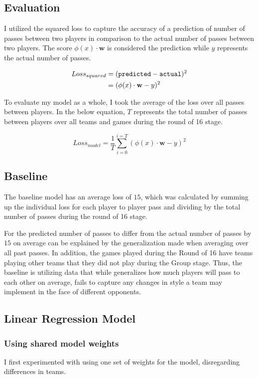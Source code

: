 \documentclass[11pt,letterpaper]{article}
\begin{document}
\subsection{Evaluation}

I utilized the squared loss to capture the accuracy of a prediction of number of passes between two players in comparison to the actual number of passes between two players. The score $\phi(x) \cdot \mathbf{w}$ is considered the prediction while $y$ represents the actual number of passes.

\begin{align*}
Loss_{squared} &= ({\tt predicted} - {\tt actual})^2 \\
&= (\phi(x) \cdot \mathbf{w} - y)^2
\end{align*}

To evaluate my model as a whole, I took the average of the loss over all passes between players. In the below equation, $T$ represents the total number of passes between players over all teams and games during the round of 16 stage.

\begin{equation}
Loss_{model} = \frac{1}{T} \sum_{i = 0}^{i = T} (\phi(x) \cdot \mathbf{w} - y)^2
\end{equation}

\subsection{Baseline}
The baseline model has an average loss of $15$, which was calculated by summing up the individual loss for each player to player pass and dividing by the total number of passes during the round of 16 stage. 

For the predicted number of passes to differ from the actual number of passes by $15$ on average can be explained by the generalization made when averaging over all past passes. In addition, the games played during the Round of 16 have teams playing other teams that they did not play during the Group stage. Thus, the baseline is utilizing data that while generalizes how much players will pass to each other on average, fails to capture any changes in style a team may implement in the face of different opponents. 

\subsection{Linear Regression Model}
\subsubsection{Using shared model weights}
I first experimented with using one set of weights for the model, disregarding differences in teams.
\end{document}
